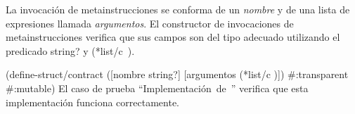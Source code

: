 \documentclass[letterpaper, twoside, openright, 11pt]{book}%
\begin{document}
La invocación de metainstrucciones se conforma de un \emph{nombre} y de una lista de expresiones llamada \emph{argumentos}. El constructor de invocaciones de metainstrucciones verifica que sus campos son del tipo adecuado utilizando el predicado {\Tt{}string?\nwendquote} y {\Tt{}(*list/c\ )\nwendquote}.

\nwenddocs{}\endmoddef\nwstartdeflinemarkup{}\nwenddeflinemarkup
(define-struct/contract 
  ([nombre string?] [argumentos (*list/c )])
  #:transparent
  #:mutable)
\eatline
{}\nwendcode{}\nwdocspar
El caso de prueba ``{\Tt{}Implementación\ de\ \nwendquote}'' verifica que esta implementación funciona correctamente.
\end{document}
